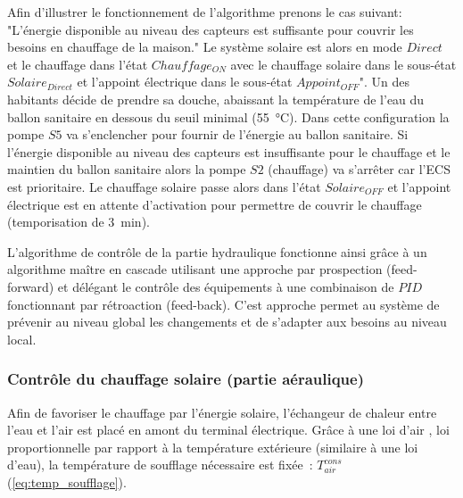 Afin d’illustrer le fonctionnement de l’algorithme prenons le cas suivant: "L’énergie
disponible au niveau des capteurs est suffisante pour couvrir les besoins en chauffage de
la maison." Le système solaire est alors en mode $Direct$ et le chauffage dans l’état
$Chauffage_{ON}$ avec le chauffage solaire dans le sous-état $Solaire_{Direct}$ et
l’appoint électrique dans le sous-état $Appoint_{OFF}$". Un des habitants décide de
prendre sa douche, abaissant la température de l’eau du ballon sanitaire en dessous du
seuil minimal (\SI{55}{\celsius}). Dans cette configuration la pompe $S5$ va s’enclencher
pour fournir de l’énergie au ballon sanitaire. Si l’énergie disponible au niveau des
capteurs est insuffisante pour le chauffage et le maintien du ballon sanitaire alors la
pompe $S2$ (chauffage) va s’arrêter car l’ECS est prioritaire. Le chauffage solaire passe
alors dans l’état $Solaire_{OFF}$ et l’appoint électrique est en attente d’activation pour
permettre de couvrir le chauffage (temporisation de \SI{3}{\minute}).


L’algorithme de contrôle de la partie hydraulique fonctionne ainsi grâce à un algorithme
maître en cascade utilisant une approche par prospection (feed-forward) et délégant le
contrôle des équipements à une combinaison de $PID$ fonctionnant par rétroaction (feed-back).
C’est approche permet au système de prévenir au niveau global les changements et de
s’adapter aux besoins au niveau local.


\subsubsection{Contrôle du chauffage solaire (partie aéraulique)} %
\label{ssub:controle_du_chauffage_solaire}
Afin de favoriser le chauffage par l’énergie solaire, l’échangeur de chaleur entre l’eau
et l’air est placé en amont du terminal électrique. Grâce à une loi d’air , loi
proportionnelle par rapport à la température extérieure (similaire à une loi d’eau), la
température de soufflage nécessaire est fixée~: $T_{air}^{cons}$ (\autoref{eq:temp_soufflage}).

